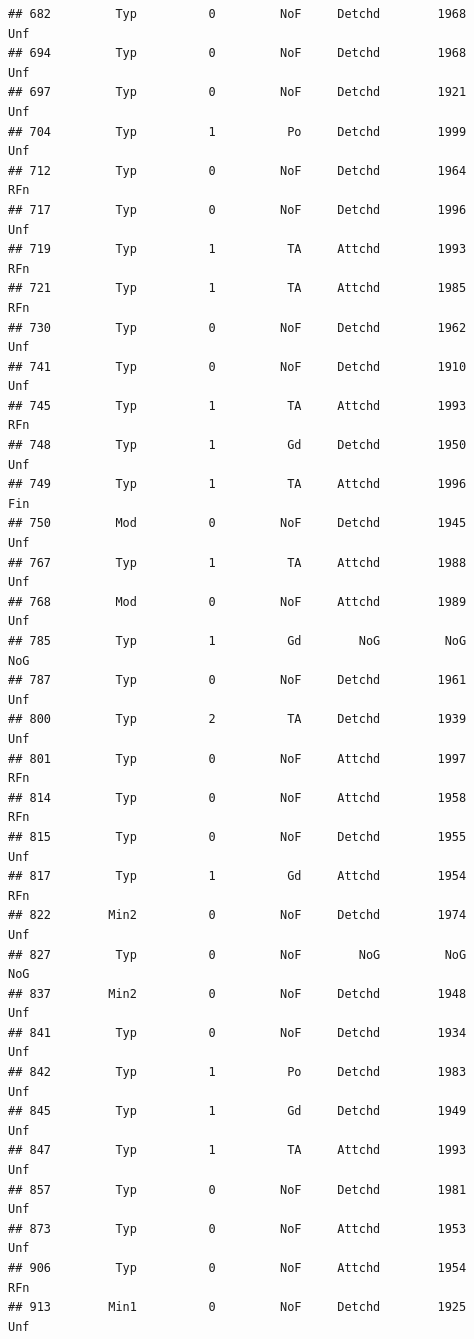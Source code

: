 \documentclass[]{article}
\begin{document}
\begin{verbatim}
## 682         Typ          0         NoF     Detchd        1968          Unf
## 694         Typ          0         NoF     Detchd        1968          Unf
## 697         Typ          0         NoF     Detchd        1921          Unf
## 704         Typ          1          Po     Detchd        1999          Unf
## 712         Typ          0         NoF     Detchd        1964          RFn
## 717         Typ          0         NoF     Detchd        1996          Unf
## 719         Typ          1          TA     Attchd        1993          RFn
## 721         Typ          1          TA     Attchd        1985          RFn
## 730         Typ          0         NoF     Detchd        1962          Unf
## 741         Typ          0         NoF     Detchd        1910          Unf
## 745         Typ          1          TA     Attchd        1993          RFn
## 748         Typ          1          Gd     Detchd        1950          Unf
## 749         Typ          1          TA     Attchd        1996          Fin
## 750         Mod          0         NoF     Detchd        1945          Unf
## 767         Typ          1          TA     Attchd        1988          Unf
## 768         Mod          0         NoF     Attchd        1989          Unf
## 785         Typ          1          Gd        NoG         NoG          NoG
## 787         Typ          0         NoF     Detchd        1961          Unf
## 800         Typ          2          TA     Detchd        1939          Unf
## 801         Typ          0         NoF     Attchd        1997          RFn
## 814         Typ          0         NoF     Attchd        1958          RFn
## 815         Typ          0         NoF     Detchd        1955          Unf
## 817         Typ          1          Gd     Attchd        1954          RFn
## 822        Min2          0         NoF     Detchd        1974          Unf
## 827         Typ          0         NoF        NoG         NoG          NoG
## 837        Min2          0         NoF     Detchd        1948          Unf
## 841         Typ          0         NoF     Detchd        1934          Unf
## 842         Typ          1          Po     Detchd        1983          Unf
## 845         Typ          1          Gd     Detchd        1949          Unf
## 847         Typ          1          TA     Attchd        1993          Unf
## 857         Typ          0         NoF     Detchd        1981          Unf
## 873         Typ          0         NoF     Attchd        1953          Unf
## 906         Typ          0         NoF     Attchd        1954          RFn
## 913        Min1          0         NoF     Detchd        1925          Unf

\end{verbatim}
\end{document}
